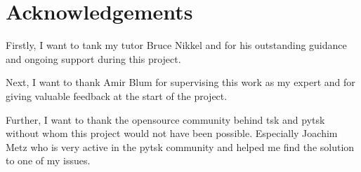 \chapter*{Acknowledgements}
\label{chap:acknowledgements}

Firstly, I want to tank my tutor Bruce Nikkel and for his outstanding guidance and ongoing support during this project.

Next, I want to thank Amir Blum for supervising this work as my expert and for giving valuable feedback at the start of the project.

Further, I want to thank the \gls{opensource} community behind \gls{tsk} and \gls{pytsk} without whom this project would not have been possible. Especially Joachim Metz who is very active in the \gls{pytsk} community and helped me find the solution to one of my issues.
